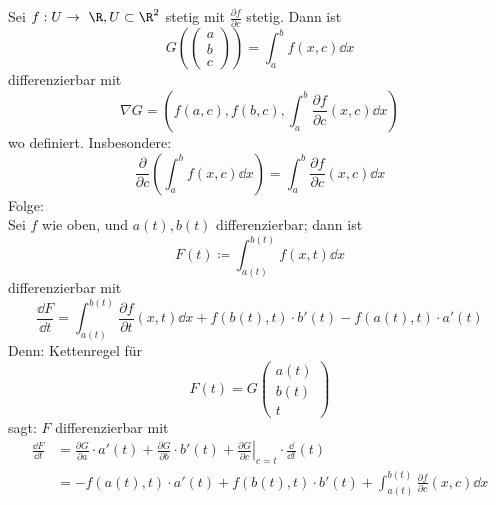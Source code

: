 \begin{fakt}
	Sei $f : U \rightarrow \R , U \subset \R^2$ stetig mit $\frac{\partial f}{\partial c}$ stetig. Dann ist
	\[ G\left(\begin{pmatrix} a \\ b \\ c \end{pmatrix}\right) = \int_a^b f(x,c) \dd x \]
	differenzierbar mit
	\[ \nabla G = \left( f(a,c) , f(b,c) , \int_a^b \frac{\partial f}{\partial c} (x,c) \dd x \right) \]
	wo definiert. Insbesondere:
	\[ \frac{\partial}{\partial c} \left( \int_a^b f(x,c) \dd x \right) = \int_a^b \frac{\partial f}{\partial c}(x,c) \dd x \]
	Folge: \\
	Sei $f$ wie oben, und $a(t) , b(t)$ differenzierbar; dann ist
	\[ F(t) \coloneqq \int_{a(t)}^{b(t)} f(x,t) \dd x \]
	differenzierbar mit
	\[ \frac{\dd F}{\dd t} = \int_{a(t)}^{b(t)} \frac{\partial f}{\partial t}(x,t) \dd x + f(b(t),t) \cdot b'(t) - f(a(t),t) \cdot a'(t) \]
	Denn: Kettenregel für
	\[ F(t) = G\begin{pmatrix} a(t) \\ b(t) \\ t \end{pmatrix} \]
	sagt: $F$ differenzierbar mit
	\[ \begin{split}
		\frac{\dd F}{\dd t}
			&= \left. \frac{\partial G}{\partial a} \cdot a'(t) + \frac{\partial G}{\partial b} \cdot b'(t) + \frac{\partial G}{\partial c} \right|_{c=t} \cdot \frac{\dd}{\dd t}(t) \\
			&= -f(a(t),t) \cdot a'(t) + f(b(t),t) \cdot b'(t) + \int_{a(t)}^{b(t)} \frac{\partial f}{\partial c}(x,c) \dd x
	\end{split} \]
\end{fakt}
